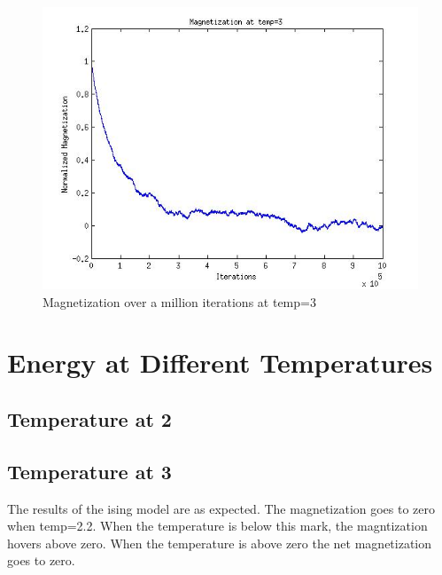 \documentclass[]{article}
\begin{document}

    \begin{figure}[b]
      \centering
      \includegraphics{figures/mag_t3.jpg}
      \caption{\label{fig:mag_T3p} Magnetization over a million iterations at temp=3}
    \end{figure}

\section{Energy at Different Temperatures}

    \subsection{\label{sec:level2} Temperature at 2}

    \subsection{\label{sec:level2} Temperature at 3}

\begin{conclusion}
The results of the ising model are as expected. The magnetization goes to zero when temp=2.2. When the temperature is below this mark, the magntization hovers above zero. When the temperature is above zero the net magnetization goes to zero. 
\end{conclusion}
\end{document}
